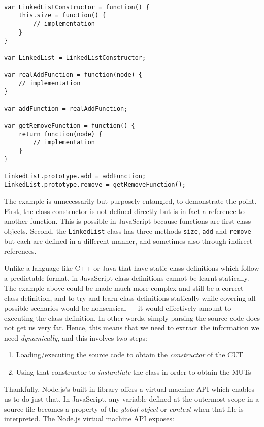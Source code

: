 \begin{lstlisting}

var LinkedListConstructor = function() {
    this.size = function() {
        // implementation
    }
}

var LinkedList = LinkedListConstructor;

var realAddFunction = function(node) {
    // implementation
}

var addFunction = realAddFunction;

var getRemoveFunction = function() {
    return function(node) {
        // implementation
    }
}

LinkedList.prototype.add = addFunction;
LinkedList.prototype.remove = getRemoveFunction();
\end{lstlisting}

The example is unnecessarily but purposely entangled, to demonstrate the point. First, the class constructor is not defined directly but is in fact a reference to another function. This is possible in JavaScript because functions are first-class objects. Second, the \texttt{LinkedList} class has three methods \texttt{size}, \texttt{add} and \texttt{remove} but each are defined in a different manner, and sometimes also through indirect references.

Unlike a language like C++ or Java that have static class definitions which follow a predictable format, in JavaScript class definitions cannot be learnt statically. The example above could be made much more complex and still be a correct class definition, and to try and learn class definitions statically while covering all possible scenarios would be nonsensical --- it would effectively amount to executing the class definition. In other words, simply parsing the source code does not get us very far. Hence, this means that we need to extract the information we need \emph{dynamically}, and this involves two steps:

\begin{enumerate}
   \item Loading/executing the source code to obtain the \emph{constructor} of the CUT
   \item Using that constructor to \emph{instantiate} the class in order to obtain the MUTs
\end{enumerate}

Thankfully, Node.js's built-in library offers a virtual machine API which enables us to do just that. In JavaScript, any variable defined at the outermost scope in a source file becomes a property of the \emph{global object} or \emph{context} when that file is interpreted. The Node.js virtual machine API exposes:\\

